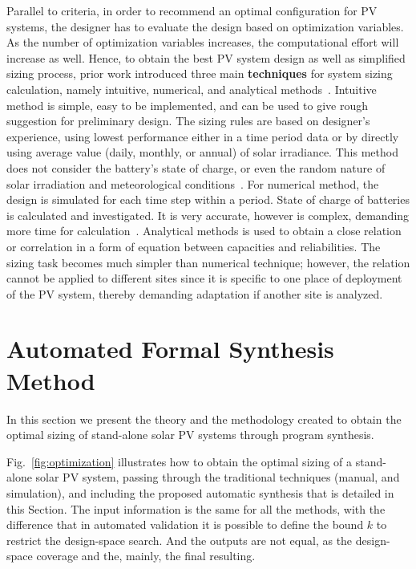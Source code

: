 \documentclass[journal]{IEEEtran}
\begin{document}
Parallel to criteria, in order to recommend an optimal configuration for PV systems, 
the designer has to evaluate the design based on optimization variables. 
As the number of optimization variables increases, the computational effort 
will increase as well. Hence, to obtain the best PV system design as well as 
simplified sizing process, prior work introduced three main \textbf{techniques} 
for system sizing calculation, namely intuitive, numerical, and analytical methods~\cite{Zhou2010}. Intuitive method is simple, easy to be implemented, and can be used to give rough suggestion for preliminary design. The sizing rules are based on designer's experience, using lowest performance either in a time period data or by directly using average value (daily, monthly, or annual) of solar irradiance. This method does not consider the battery's state of charge, or even the random nature of solar irradiation and meteorological conditions~\cite{Alsadi2018}. For numerical method, the design is simulated for each time step within a period. State of charge of batteries is calculated and investigated. It is very accurate, however is complex, demanding more time for calculation~\cite{Park2004}. Analytical methods is used to obtain a close relation or correlation in a form of equation between capacities and reliabilities. The sizing task becomes much simpler than numerical technique; however, the relation cannot be applied to different sites since it is specific to one place of deployment of the PV system, 
thereby demanding adaptation if another site is analyzed.

\section{Automated Formal Synthesis Method}
\label{sec:Method}

In this section we present the theory and the methodology created to obtain the optimal sizing of stand-alone solar PV systems through program synthesis.

Fig.~\ref{fig:optimization} illustrates how to obtain the optimal sizing of a stand-alone solar PV system, passing through the traditional techniques (manual, and simulation), and including the proposed automatic synthesis that is detailed in this Section. The input information is the same for all the methods, with the difference that in automated validation it is possible to define the bound $k$ to restrict the design-space search. And the outputs are not equal, as the design-space coverage and the, mainly, the final resulting.
\end{document}
